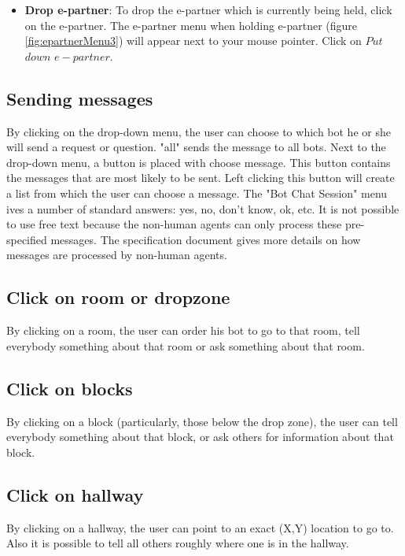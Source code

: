 \begin{itemize}
\item \textbf{Drop e-partner}:
To drop the e-partner which is currently being held, click on the e-partner. The e-partner menu when holding e-partner (figure  \ref{fig:epartnerMenu3}) will appear next to your mouse pointer. Click on $Put$ $down$ $e-partner$.

\end{itemize}


\subsection{Sending messages}
By clicking on the drop-down menu, the user can choose to which bot he or she will send a request or question. "all" sends the message to all bots. Next to the drop-down menu, a button is placed with choose message. This button contains the messages that are most likely to be sent. Left clicking this button will create a list from which the user can choose a message. The "Bot Chat Session" menu ives a number of standard answers: yes, no, don't know, ok, etc. It is not possible to use free text because the non-human agents can only process these pre-specified messages. The specification document gives more details on how messages are processed by non-human agents.

\subsection{Click on room or dropzone}
By clicking on a room, the user can order his bot to go to that room, tell everybody something about that room or ask something about that room.
\subsection{Click on blocks}
By clicking on a block (particularly, those below the drop zone), the user can tell everybody something about that block, or ask others for information about that block.
\subsection{Click on hallway}
By clicking on a hallway, the user can point to an exact (X,Y) location to go to. Also it is possible to tell all others roughly where one is in the hallway.


